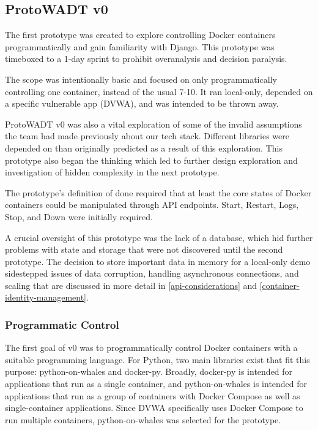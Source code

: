 \documentclass[../design-document.tex]{subfiles}
\begin{document}
\subsection{ProtoWADT v0}
The first prototype was created to explore controlling Docker containers programmatically and gain familiarity with Django. This prototype was timeboxed to a 1-day sprint to prohibit overanalysis and decision paralysis.

The scope was intentionally basic and focused on only programmatically controlling one container, instead of the usual 7-10. It ran local-only,
depended on a specific vulnerable app (DVWA), and was intended to be thrown away.

ProtoWADT v0 was also a vital exploration of some of the invalid assumptions the team had made previously about our tech stack. Different libraries were depended on than originally predicted as a result of this exploration. This prototype also began the thinking which led to further design exploration and investigation of hidden complexity in the next prototype.

The prototype's definition of done required that at least the core states of Docker containers could be manipulated through API endpoints. Start, Restart, Logs, Stop, and Down were initially required.

A crucial oversight of this prototype was the lack of a database, which hid further problems with state and storage that were not discovered until the second prototype. The decision to store important data in memory for a local-only demo sidestepped issues of data corruption, handling asynchronous connections, and scaling that are discussed in more detail in \ref{api-considerations} and \ref{container-identity-management}.

\subsubsection{Programmatic Control}
The first goal of v0 was to programmatically control Docker containers with a suitable programming language. For Python, two main libraries exist that fit this purpose: python-on-whales and docker-py. Broadly, docker-py is intended for applications that run as a single container, and python-on-whales is intended for applications that run as a group of containers with Docker Compose as well as single-container applications. Since DVWA specifically uses Docker Compose to run multiple containers, python-on-whales was selected for the prototype.
\end{document}
